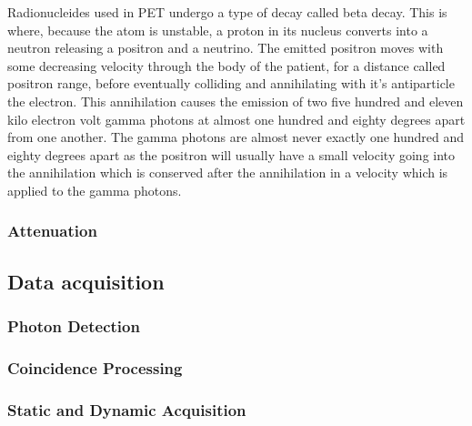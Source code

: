             Radionucleides used in \gls{PET} undergo a type of decay called beta decay. This is where, because the atom is unstable, a proton in its nucleus converts into a neutron releasing a positron and a neutrino. The emitted positron moves with some decreasing velocity through the body of the patient, for a distance called positron range, before eventually colliding and annihilating with it's antiparticle the electron. This annihilation causes the emission of two five hundred and eleven kilo electron volt gamma photons at almost one hundred and eighty degrees apart from one another. The gamma photons are almost never exactly one hundred and eighty degrees apart as the positron will usually have a small velocity going into the annihilation which is conserved after the annihilation in a velocity which is applied to the gamma photons.
            
            \subsubsection{Attenuation} \label{attenuation}
                \blindtext
        
        \subsection{Data acquisition} \label{data_acquisition}
            \blindtext
            
            \subsubsection{Photon Detection} \label{photon_detection}
                \blindtext
            
            \subsubsection{Coincidence Processing} \label{coincidence_processing}
                \blindtext
            
            \subsubsection{Static and Dynamic Acquisition} \label{static_and_dynamic_acquisition}
                \blindtext
            
